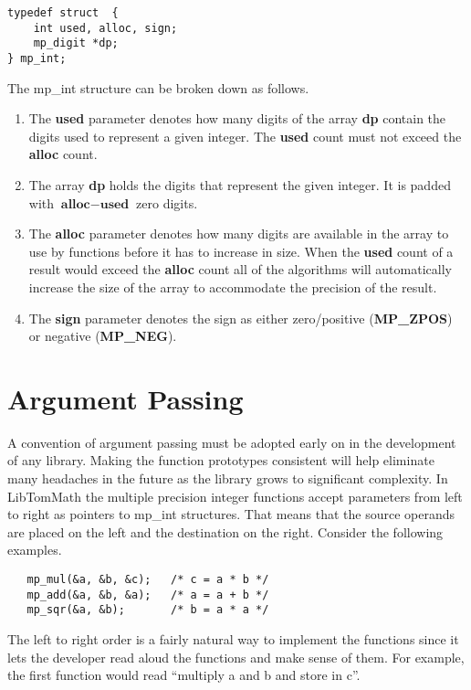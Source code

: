 \documentclass[b5paper]{book}
\begin{document}
\begin{verbatim}
typedef struct  {
    int used, alloc, sign;
    mp_digit *dp;
} mp_int;
\end{verbatim}

The mp\_int structure can be broken down as follows.

\begin{enumerate}
\item The \textbf{used} parameter denotes how many digits of the array \textbf{dp} contain the digits used to represent
a given integer.  The \textbf{used} count must not exceed the \textbf{alloc} count.  

\item The array \textbf{dp} holds the digits that represent the given integer.  It is padded with $\textbf{alloc} - \textbf{used}$ zero
digits.

\item The \textbf{alloc} parameter denotes how 
many digits are available in the array to use by functions before it has to increase in size.  When the \textbf{used} count 
of a result would exceed the \textbf{alloc} count all of the algorithms will automatically increase the size of the 
array to accommodate the precision of the result.  

\item The \textbf{sign} parameter denotes the sign as either zero/positive (\textbf{MP\_ZPOS}) or negative (\textbf{MP\_NEG}).  
\end{enumerate}

\section{Argument Passing}
A convention of argument passing must be adopted early on in the development of any library.  Making the function prototypes
consistent will help eliminate many headaches in the future as the library grows to significant complexity.  In LibTomMath the multiple precision 
integer functions accept parameters from left to right as pointers to mp\_int structures.  That means that the source operands are 
placed on the left and the destination on the right.   Consider the following examples.

\begin{verbatim}
   mp_mul(&a, &b, &c);   /* c = a * b */
   mp_add(&a, &b, &a);   /* a = a + b */
   mp_sqr(&a, &b);       /* b = a * a */
\end{verbatim}

The left to right order is a fairly natural way to implement the functions since it lets the developer read aloud the
functions and make sense of them.  For example, the first function would read ``multiply a and b and store in c''.
\end{document}

